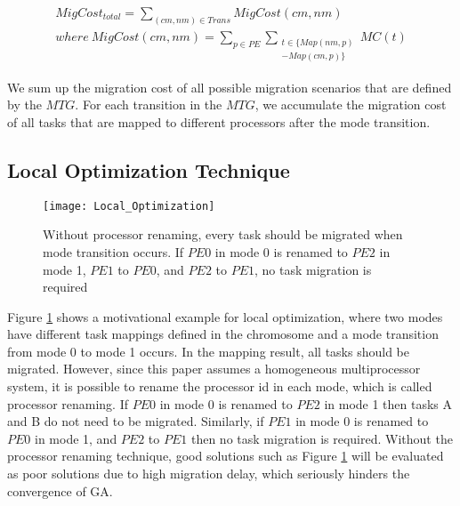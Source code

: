 \documentclass[prodmode,acmtecs]{acmsmall}
\begin{document}
\begin{definition}
\label{Definition:Total task migration cost}
\begin{gather*}
MigCost_{total} = \sum_{(cm, nm) \in Trans} MigCost(cm, nm) \\
where \: MigCost(cm, nm) = \sum_{p \in PE} \sum_{\substack{t \in \lbrace Map(nm, p) \\ - Map(cm, p)\rbrace}} MC(t)
\end{gather*}
\end{definition}

We sum up the migration cost of all possible migration scenarios that are defined by the $MTG$. For each transition in the $MTG$, we accumulate the migration cost of all tasks that are mapped to different processors after the mode transition.

\subsection{Local Optimization Technique}
\label{SubSection:Local Optimization Technique}

\begin{figure} [ht]
\centerline{\texttt{[image: Local\_Optimization]}}
\caption{Without processor renaming, every task should be migrated when mode transition occurs. If $PE0$ in mode 0 is renamed to $PE2$ in mode 1, $PE1$ to $PE0$, and $PE2$ to $PE1$, no task migration is required}
\label{Figure:Local Optimization}
\end{figure}

Figure \ref{Figure:Local Optimization} shows a motivational example for local optimization, where two modes have different task mappings defined in the chromosome and a mode transition from mode 0 to mode 1 occurs. In the mapping result, all tasks should be migrated. However, since this paper assumes a homogeneous multiprocessor system, it is possible to rename the processor id in each mode, which is called processor renaming. If $PE0$ in mode 0 is renamed to $PE2$ in mode 1 then tasks A and B do not need to be migrated. Similarly, if $PE1$ in mode 0 is renamed to $PE0$ in mode 1, and $PE2$ to $PE1$ then no task migration is required. Without the processor renaming technique, good solutions such as Figure \ref{Figure:Local Optimization} will be evaluated as poor solutions due to high migration delay, which seriously hinders the convergence of GA.
\end{document}
